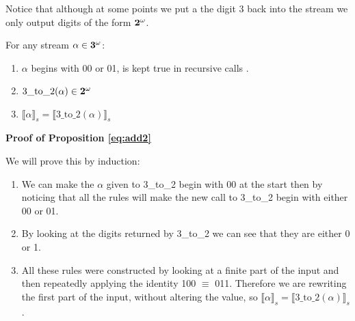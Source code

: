 \documentclass{cs4rep}
\begin{document}
Notice that although at some points we put a the digit 3 back into the
stream we only output digits of the form ${\bf 2}^{\omega}$.

\begin{myprop} \label{eq:add2}
For any stream $\alpha \in {\bf 3}^{\omega}$:
\begin{enumerate}
\item $\alpha$ begins with 00 or 01, is kept true in recursive calls               .
\item $\mbox{3\_to\_2}(\alpha) \in {\bf 2}^{\omega}$
\item $ \llbracket \alpha \rrbracket_{s} = \llbracket
  \mbox{3\_to\_2}(\alpha) \rrbracket_{s} $
\end{enumerate}
\end{myprop}

{\bf Proof of Proposition \ref{eq:add2}}

We will prove this by induction:

\begin{enumerate}
\item We can make the $\alpha$ given to 3\_to\_2 begin with 00 at the
  start then by noticing that all the rules will make the new call to
  3\_to\_2 begin with either 00 or 01.
\item By looking at the digits returned by 3\_to\_2 we can see that
  they are either 0 or 1.
\item All these rules were constructed by looking at a finite part of
  the input and then repeatedly applying the identity 100 $\equiv$
  011. Therefore we are rewriting the first part of the input, without altering the value, so $
  \llbracket \alpha \rrbracket_{s} = \llbracket
  \mbox{3\_to\_2}(\alpha) \rrbracket_{s} $.
\end{enumerate}
\end{document}

